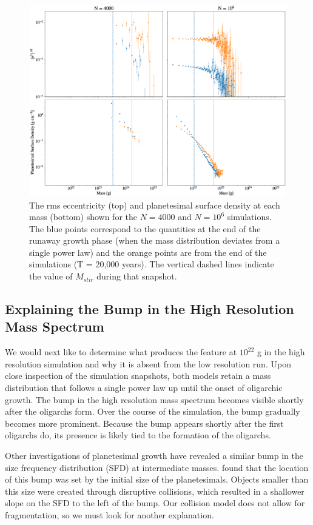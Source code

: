 \begin{figure}
    \includegraphics[width=\textwidth]{figures/plSS/ecc_den_evo.eps}
    \caption{The rms eccentricity (top) and planetesimal surface density at each mass (bottom) shown for the $N = 4000$ and 
    $N = 10^6$ simulations. The blue points correspond to the quantities at the end of the runaway growth phase (when the 
    mass distribution deviates from a single power law) and the orange points are from the end of the simulations (T = 20,000 
    years). The vertical dashed lines indicate the value of $M_{stir}$ during that snapshot.}
    \label{fig:ecc_den_evo}
\end{figure}

\subsection{Explaining the Bump in the High Resolution Mass Spectrum}\label{sec:bump}

We would next like to determine what produces the feature at $10^{22}$ g in the high resolution simulation and why it is absent 
from the low resolution run. Upon close inspection of the simulation snapshots, both models retain a mass distribution that 
follows a single power law up until the onset of oligarchic growth. The bump in the high resolution mass spectrum becomes 
visible shortly after the oligarchs form. Over the course of the simulation, the bump gradually becomes more prominent. Because 
the bump appears shortly after the first oligarchs do, its presence is likely tied to the formation of the oligarchs.

Other investigations of planetesimal growth have revealed a similar bump in the size frequency distribution (SFD) at intermediate 
masses. \cite{morbidelli09} found that the location of this bump was set by the initial size of the planetesimals. Objects smaller 
than this size were created through disruptive collisions, which resulted in a shallower slope on the SFD to the left of the bump. 
Our collision model does not allow for fragmentation, so we must look for another explanation.

